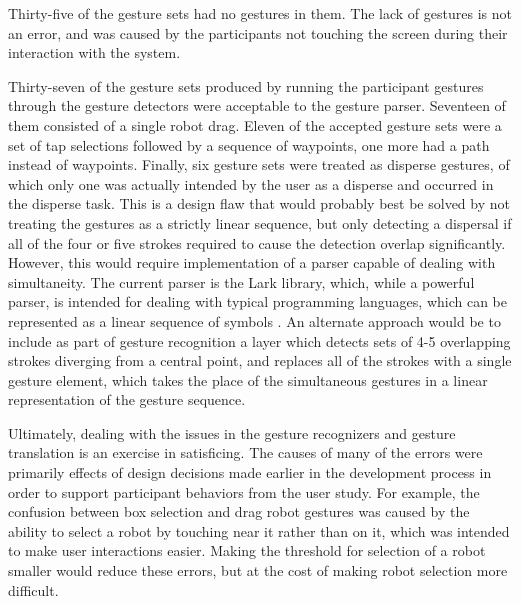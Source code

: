 Thirty-five of the gesture sets had no gestures in them. The lack of gestures is not an error, and was caused by the participants not touching the screen during their interaction with the system. 

Thirty-seven of the gesture sets produced by running the participant gestures through the gesture detectors were acceptable to the gesture parser. 
Seventeen of them consisted of a single robot drag. 
Eleven of the accepted gesture sets were a set of tap selections followed by a sequence of waypoints, one more had a path instead of waypoints. 
Finally, six gesture sets were treated as disperse gestures, of which only one was actually intended by the user as a disperse and occurred in the disperse task. 
This is a design flaw that would probably best be solved by not treating the gestures as a strictly linear sequence, but only detecting a dispersal if all of the four or five strokes required to cause the detection overlap significantly. 
However, this would require implementation of a parser capable of dealing with simultaneity. 
The current parser is the Lark library, which, while a powerful parser, is intended for dealing with typical programming languages, which can be represented as a linear sequence of symbols \citep{LarkParser}. 
An alternate approach would be to include as part of gesture recognition a layer which detects sets of 4-5 overlapping strokes diverging from a central point, and replaces all of the strokes with a single gesture element, which takes the place of the simultaneous gestures in a linear representation of the gesture sequence. 

Ultimately, dealing with the issues in the gesture recognizers and gesture translation is an exercise in satisficing. 
The causes of many of the errors were primarily effects of design decisions made earlier in the development process in order to support participant behaviors from the user study. 
For example, the confusion between box selection and drag robot gestures was caused  by the ability to select a robot by touching near it rather than on it, which was intended to make user interactions easier. 
Making the threshold for selection of a robot smaller would reduce these errors, but at the cost of making robot selection more difficult. 

%

